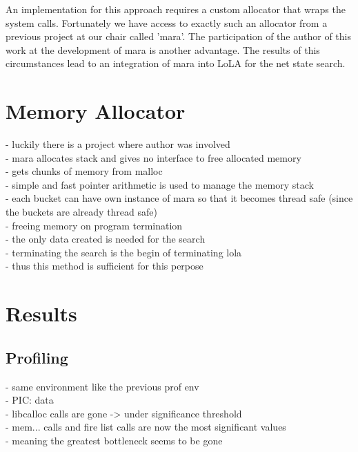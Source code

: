 An implementation for this approach requires a custom allocator that wraps the system calls. Fortunately we have access to exactly such an allocator from a previous project at our chair called 'mara'. The participation of the author of this work at the development of mara is another advantage. The results of this circumstances lead to an integration of mara into LoLA for the net state search.

\section{Memory Allocator}
- luckily there is a project where author was involved\\
- mara allocates stack and gives no interface to free allocated memory\\
- gets chunks of memory from malloc\\
- simple and fast pointer arithmetic is used to manage the memory stack\\
- each bucket can have own instance of mara so that it becomes thread safe (since the buckets are already thread safe)\\
- freeing memory on program termination\\
- the only data created is needed for the search\\
- terminating the search is the begin of terminating lola\\
- thus this method is sufficient for this perpose\\ 

\section{Results}
\subsection{Profiling}
- same environment like the previous prof env\\
- PIC: data\\
- libcalloc calls are gone -> under significance threshold\\
- mem... calls and fire list calls are now the most significant values\\
- meaning the greatest bottleneck seems to be gone\\

